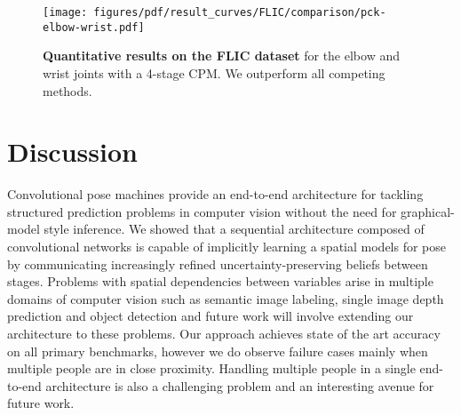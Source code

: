 \documentclass[10pt,twocolumn,letterpaper]{article}
\begin{document}
\begin{figure}[ht!]
    \centering
    \texttt{[image: figures/pdf/result\_curves/FLIC/comparison/pck-elbow-wrist.pdf]}
    \vspace{-20pt}
    \caption{\textbf{Quantitative results on the FLIC dataset} for the elbow and wrist joints with a 4-stage  CPM. We outperform all competing methods.}
    \label{fig:flic_quant}
\end{figure}

\vspace{-10pt}\section{Discussion}\vspace{-5pt}%
Convolutional pose machines provide an end-to-end architecture for tackling structured prediction problems in computer vision without the need for graphical-model style inference. We showed that a sequential architecture composed of convolutional networks is capable of implicitly learning a spatial models for pose by communicating increasingly refined uncertainty-preserving beliefs between stages. Problems with spatial dependencies between variables arise in multiple domains of computer vision such as semantic image labeling, single image depth prediction and object detection and future work will involve extending our architecture to these problems.
Our approach achieves state of the art accuracy on all primary benchmarks, however we do observe failure cases mainly when multiple people are in close proximity. Handling multiple people in a single end-to-end architecture is also a challenging problem and an interesting avenue for future work.

{\small


}
\end{document}
